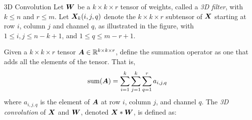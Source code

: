 %
\begin{frame}{3D Convolution}
Let ${\boldsymbol W}$ be a $k \times k \times r$ tensor of weights, called a {\em 3D
filter}, with $k \le n$ and $r \le m$. 
Let ${\boldsymbol X}_k(i,j,q)$ denote the $k \times k \times r$ subtensor of ${\boldsymbol X}$ 
starting at row $i$, column
$j$ and channel $q$, as illustrated in the figure, %
with $1 \le i, j \le n-k+1$, and $1 \le q \le m-r+1$.

Given a $k \times k \times r$ tensor ${\boldsymbol A} \in {\mathord{\mathbb R}}^{k \times k \times r}$, 
define the summation operator as one
that adds all the elements of the tensor. That is,
\begin{align*}
    \operatorname*{sum}({\boldsymbol A}) = \sum_{i=1}^k \sum_{j=1}^k \sum^{r}_{q=1} a_{i,j,q}
\end{align*}
where $a_{i,j,q}$ is the element of ${\boldsymbol A}$ at row $i$, column $j$, and
channel $q$.
The {\em 3D convolution} of ${\boldsymbol X}$ and ${\boldsymbol W}$, denoted ${\boldsymbol X} \ast
{\boldsymbol W}$, is defined as:

\end{frame}

